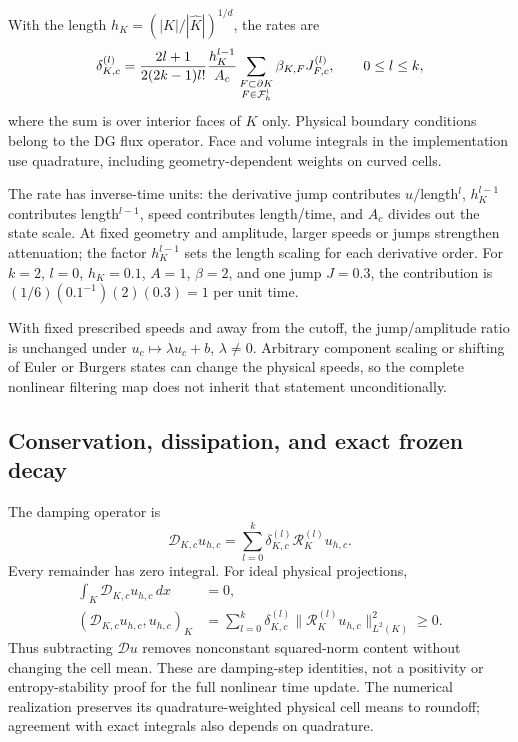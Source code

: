 With the length $h_K=(|K|/|\widehat K|)^{1/d}$, the rates are
\begin{equation}
 \delta_{K,c}^{(l)}=
 \frac{2l+1}{2(2k-1)l!}\frac{h_K^{l-1}}{A_c}
 \sum_{\substack{F\subset\partial K\\F\in\mathcal F_h^{\rm i}}}
 \beta_{K,F}J_{F,c}^{(l)},\qquad 0\leq l\leq k,
 \label{eq:ofdg-damping-rate}
\end{equation}
where the sum is over interior faces of $K$ only. Physical boundary conditions
belong to the DG flux operator. Face and volume integrals in the implementation
use quadrature, including geometry-dependent weights on curved cells.

The rate has inverse-time units: the derivative jump contributes $u/$length$^l$,
$h_K^{l-1}$ contributes length$^{l-1}$, speed contributes length/time, and
$A_c$ divides out the state scale. At fixed geometry and amplitude, larger speeds or jumps strengthen
attenuation; the factor $h_K^{l-1}$ sets the length scaling for each derivative order. For $k=2$, $l=0$, $h_K=0.1$, $A=1$,
$\beta=2$, and one jump $J=0.3$, the contribution is
$(1/6)(0.1^{-1})(2)(0.3)=1$ per unit time.

With fixed prescribed speeds and away from the cutoff, the jump/amplitude
ratio is unchanged under $u_c\mapsto\lambda u_c+b$, $\lambda\ne0$.
Arbitrary component scaling or shifting of Euler or Burgers states can change
the physical speeds, so the complete nonlinear filtering map does not inherit
that statement unconditionally.

\subsection{Conservation, dissipation, and exact frozen decay}
The damping operator is
\begin{equation}
 \mathcal D_{K,c}u_{h,c}=\sum_{l=0}^k\delta_{K,c}^{(l)}
          \mathcal R_K^{(l)}u_{h,c}.
 \label{eq:ofdg-damping-operator}
\end{equation}
Every remainder has zero integral. For ideal physical projections,
\begin{align}
 \int_K\mathcal D_{K,c}u_{h,c}\,dx&=0,
 \label{eq:ofdg-local-conservation}\\
 (\mathcal D_{K,c}u_{h,c},u_{h,c})_K
 &=\sum_{l=0}^k\delta_{K,c}^{(l)}
       \|\mathcal R_K^{(l)}u_{h,c}\|_{L^2(K)}^2\geq0.
 \label{eq:ofdg-dissipation}
\end{align}
Thus subtracting $\mathcal D u$ removes nonconstant squared-norm content
without changing the cell mean. These are damping-step identities, not a
positivity or entropy-stability proof for the full nonlinear time update.
The numerical realization preserves its quadrature-weighted physical cell
means to roundoff; agreement with exact integrals also depends on quadrature.

